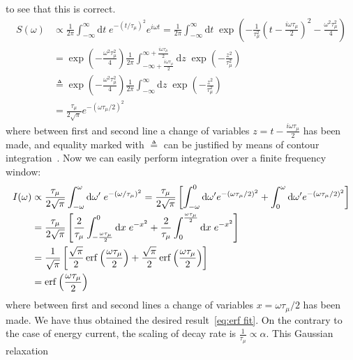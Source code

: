 to see that this is correct.
\begin{align}
  S(\omega) &\propto \frac{1}{2\pi} \int_{-\infty}^{\infty} \mathrm{d}t \; e^{-(t/\tau_{\mu})^2}
  e^{i\omega t} = \frac{1}{2\pi} \int_{-\infty}^{\infty} \mathrm{d}t \; 
  \exp\left(-\frac{1}{\tau_{\mu}^2} \left(t-\frac{i\omega\tau_{\mu}}{2}\right)^2 
  - \frac{\omega^2\tau_{\mu}^2}{4}\right) \nonumber \\
  &= \exp\left(- \frac{\omega^2\tau_{\mu}^2}{4}\right) \frac{1}{2\pi}
  \int_{-\infty+\frac{i\omega\tau_{\mu}}{2}}^{\infty+\frac{i\omega\tau_{\mu}}{2}} 
  \mathrm{d} z\; \exp\left(-\frac{z^2}{\tau_{\mu}^2}\right) \nonumber\\
  & \triangleq \exp\left(- \frac{\omega^2
  \tau_{\mu}^2}{4}\right) \frac{1}{2\pi} \int_{-\infty}^{\infty}
  \mathrm{d} z\; \exp\left(-\frac{z^2}{\tau_{\mu}^2}\right) \nonumber  \\
  &= \frac{\tau_{\mu}}{2\sqrt{\pi}}e^{-(\omega \tau_{\mu}/2)^2}
\end{align}
where between first and second line a change of variables \(z = t-\frac{i \omega \tau_{\mu}}{2}\)
has been made, and equality marked with \(\triangleq\) can be justified by means of contour
integration~\autocite{Stein2010}. Now we can easily perform integration over a finite
frequency window:
\begin{align}
  I(\omega) &\propto \frac{\tau_{\mu}}{2\sqrt{\pi}}\int_{-\omega}^{\omega} \mathrm{d}\omega^{\prime}\;
  e^{-(\omega/\tau_{\mu})^2} = \frac{\tau_{\mu}}{2\sqrt{\pi}}
  \left[\int_{-\omega}^{0} \mathrm{d}\omega^{\prime} e^{-(\omega\tau_{\mu}/2)^2} + 
  \int_{0}^{\omega} \mathrm{d}\omega^{\prime} e^{-(\omega\tau_{\mu}/2)^2} \right]\nonumber\\
  &= \frac{\tau_{\mu}}{2\sqrt{\pi}} \left[ \frac{2}{\tau_{\mu}}\int_{-\frac{\omega\tau_{\mu}}{2}}^{0} 
  \mathrm{d} x\;  e^{-x^2} + \frac{2}{\tau_{\mu}}\int_{0}^{\frac{\omega\tau_{\mu}}{2}}
   \mathrm{d}x\; e^{-x^2} \right]\nonumber\\ 
   &= \frac{1}{\sqrt{\pi}} \left[ \frac{\sqrt{\pi}}{2} \erf\left(\frac{\omega\tau_{\mu}}{2}\right) +
   \frac{\sqrt{\pi}}{2} \erf\left(\frac{\omega\tau_{\mu}}{2}\right) \right]\nonumber\\
    &= \erf\left(\frac{\omega\tau_{\mu}}{2}\right)
\end{align}
where between first and second lines a change of variables \(x=\omega\tau_{\mu}/2\) has been made.
We have thus obtained the desired result~\ref{eq:erf fit}. On the contrary to the case of energy
current, the scaling of decay rate is \(\frac{1}{\tau_{\mu}} \propto \alpha\). This Gaussian relaxation
